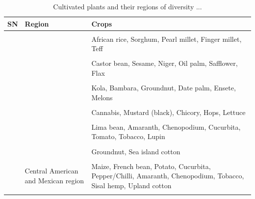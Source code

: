 \documentclass[11pt,ignorenonframetext,aspectratio=169]{beamer}
\begin{document}
\begin{frame}{}
\protect\hypertarget{section-8}{}
\begin{table}

\caption{\label{tab:cultivated-megacentres-tab3}Cultivated plants and their regions of diversity ...}
\centering
\fontsize{6}{8}\selectfont
\begin{tabular}[t]{>{\raggedright\arraybackslash}p{4em}>{\raggedright\arraybackslash}p{14em}>{\raggedright\arraybackslash}p{28em}}
\toprule
SN & Region & Crops\\
\midrule
\cellcolor{gray!6}{8} & \cellcolor{gray!6}{African region} & \cellcolor{gray!6}{Wheat (Durum, Emmer, Poulard, Bread)}\\
 &  & African rice, Sorghum, Pearl millet, Finger millet, Teff\\
\cellcolor{gray!6}{} & \cellcolor{gray!6}{} & \cellcolor{gray!6}{Cowpea, Bottle gourd, Okra, Yams, Cucumber}\\
 &  & Castor bean, Sesame, Niger, Oil palm, Safflower, Flax\\
\cellcolor{gray!6}{} & \cellcolor{gray!6}{} & \cellcolor{gray!6}{Cotton, Kenaf, Coffee}\\
\addlinespace
 &  & Kola, Bambara, Groundnut, Date palm, Ensete, Melons\\
\cellcolor{gray!6}{9} & \cellcolor{gray!6}{European-siberian region} & \cellcolor{gray!6}{Peach, Pear, Plum, Apricot, Apple, Almond, Walnut, Pistachio, Cherry}\\
 &  & Cannabis, Mustard (black), Chicory, Hops, Lettuce\\
\cellcolor{gray!6}{10} & \cellcolor{gray!6}{South American region} & \cellcolor{gray!6}{Potato, Sweet potato, Xanthosoma}\\
 &  & Lima bean, Amaranth, Chenopodium, Cucurbita, Tomato, Tobacco, Lupin\\
\addlinespace
\cellcolor{gray!6}{} & \cellcolor{gray!6}{} & \cellcolor{gray!6}{Papaya, Pineapple}\\
 &  & Groundnut, Sea island cotton\\
\cellcolor{gray!6}{} & \cellcolor{gray!6}{} & \cellcolor{gray!6}{Cassava, Cacao, Rubber tree, Passion fruit}\\
11 & Central American and Mexican region & Maize, French bean, Potato, Cucurbita, Pepper/Chilli, Amaranth, Chenopodium, Tobacco, Sisal hemp, Upland cotton\\
\cellcolor{gray!6}{12} & \cellcolor{gray!6}{North American region} & \cellcolor{gray!6}{Jeruselum artichoke, Sunflower, Plum, Raspberry, Strawberry}\\
\bottomrule
\end{tabular}
\end{table}
\end{frame}
\end{document}
